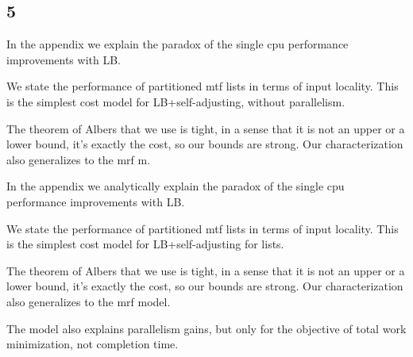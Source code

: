 \subsection{5}



In the appendix we explain the paradox of the single cpu performance improvements with LB.

We state the performance of partitioned mtf lists in terms of input locality. This is the simplest cost model for LB+self-adjusting, without parallelism.

The theorem of Albers that we use is tight, in a sense that it is not an upper or a lower bound, it's exactly the cost, so our bounds are strong. Our characterization also generalizes to the mrf m.








In the appendix we analytically explain the paradox of the single cpu performance improvements with LB.

We state the performance of partitioned mtf lists in terms of input locality. This is the simplest cost model for LB+self-adjusting for lists.

The theorem of Albers that we use is tight, in a sense that it is not an upper or a lower bound, it's exactly the cost, so our bounds are strong. Our characterization also generalizes to the mrf model.

The model also explains parallelism gains, but only for the objective of total work minimization, not completion time.